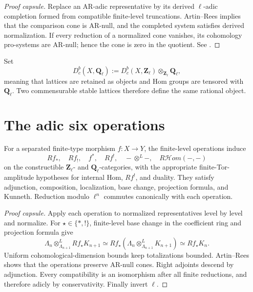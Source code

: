 \begin{proof}[Proof capsule]
Replace an AR-adic representative by its derived \(\ell\)-adic completion
formed from compatible finite-level truncations.  Artin--Rees implies that
the comparison cone is AR-null, and the completed system satisfies derived
normalization.  If every reduction of a normalized cone vanishes, its
cohomology pro-systems are AR-null; hence the cone is zero in the quotient.
See \cite{KiehlWeissauer}.
\end{proof}

\begin{definition}
\label{def:adic-derived}
Set
\[
 D^b_c(X,\mathbf Q_\ell)
 :=D^b_c(X,\mathbf Z_\ell)\otimes_{\mathbf Z_\ell}\mathbf Q_\ell,
\]
meaning that lattices are retained as objects and Hom groups are tensored
with \(\mathbf Q_\ell\).  Two commensurable stable lattices therefore define
the same rational object.
\end{definition}

\section{The adic six operations}

\begin{theorem}
\label{thm:adic-six-ops}
For a separated finite-type morphism \(f:X\to Y\), the finite-level operations
induce
\[
 Rf_*,\quad Rf_!,\quad f^*,\quad Rf^!,\quad
 -\otimes^L-,\quad R\mathcal Hom(-,-)
\]
on the constructible \(\mathbf Z_\ell\)- and \(\mathbf Q_\ell\)-categories,
with the appropriate finite-Tor-amplitude hypotheses for internal Hom,
\(Rf^!\), and duality.  They satisfy adjunction, composition, localization,
base change, projection formula, and Kunneth.  Reduction modulo \(\ell^n\)
commutes canonically with each operation.
\end{theorem}

\begin{proof}[Proof capsule]
Apply each operation to normalized representatives level by level and
normalize.  For \(\star\in\{*,!\}\), finite-level base change in the
coefficient ring and projection formula give
\[
 \Lambda_n\otimes^L_{\Lambda_{n+1}}Rf_\star K_{n+1}
 \simeq Rf_\star
  (\Lambda_n\otimes^L_{\Lambda_{n+1}}K_{n+1})
 \simeq Rf_\star K_n.
\]
Uniform cohomological-dimension bounds keep totalizations bounded.
Artin--Rees shows that the operations preserve AR-null cones.  Right adjoints
descend by adjunction.  Every compatibility is an isomorphism after all
finite reductions, and therefore adicly by conservativity.  Finally invert
\(\ell\).
\end{proof}

